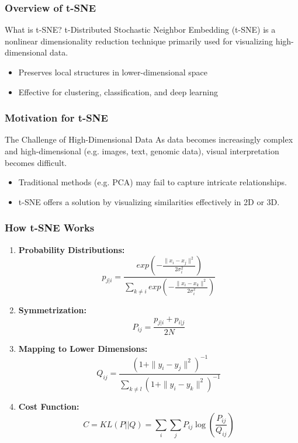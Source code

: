 \documentclass[aspectratio=169]{beamer}
\begin{document}
\begin{frame}[fragile]
    \frametitle{Overview of t-SNE}
    \begin{block}{What is t-SNE?}
        t-Distributed Stochastic Neighbor Embedding (t-SNE) is a nonlinear dimensionality reduction technique primarily used for visualizing high-dimensional data.
    \end{block}
    \begin{itemize}
        \item Preserves local structures in lower-dimensional space
        \item Effective for clustering, classification, and deep learning
    \end{itemize}
\end{frame}

\begin{frame}[fragile]
    \frametitle{Motivation for t-SNE}
    \begin{block}{The Challenge of High-Dimensional Data}
        As data becomes increasingly complex and high-dimensional (e.g. images, text, genomic data), visual interpretation becomes difficult.
    \end{block}
    \begin{itemize}
        \item Traditional methods (e.g. PCA) may fail to capture intricate relationships.
        \item t-SNE offers a solution by visualizing similarities effectively in 2D or 3D.
    \end{itemize}
\end{frame}

\begin{frame}[fragile]
    \frametitle{How t-SNE Works}
    \begin{enumerate}
        \item \textbf{Probability Distributions:}
        \begin{equation}
            p_{j|i} = \frac{exp\left(-\frac{\|x_i - x_j\|^2}{2\sigma_i^2}\right)}{\sum_{k \neq i} exp\left(-\frac{\|x_i - x_k\|^2}{2\sigma_i^2}\right)}
        \end{equation}
        
        \item \textbf{Symmetrization:}
        \begin{equation}
            P_{ij} = \frac{p_{j|i} + p_{i|j}}{2N}
        \end{equation}
        
        \item \textbf{Mapping to Lower Dimensions:}
        \begin{equation}
            Q_{ij} = \frac{(1 + \|y_i - y_j\|^2)^{-1}}{\sum_{k \neq l}(1 + \|y_i - y_k\|^2)^{-1}}
        \end{equation}
        
        \item \textbf{Cost Function:}
        \begin{equation}
            C = KL(P || Q) = \sum_{i} \sum_{j} P_{ij} \log\left(\frac{P_{ij}}{Q_{ij}}\right)
        \end{equation}
    \end{enumerate}
\end{frame}
\end{document}
